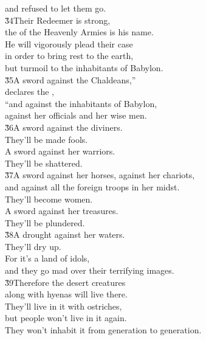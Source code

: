 \begin{poetry}
\poemll    and refused to let them go. \\
\poeml \v{34}Their Redeemer is strong, \\
\poemll    the  of the Heavenly Armies is his name. \\
\poeml He will vigorously plead their case \\
\poemll    in order to bring rest to the earth, \\
\poemlll       but turmoil to the inhabitants of Babylon. \\
\poeml \v{35}A sword against the Chaldeans,'' \\
\poemll    declares the , \\
\poeml ``and against the inhabitants of Babylon, \\
\poemll    against her officials and her wise men. \\
\poeml \v{36}A sword against the diviners. \\
\poemll    They'll be made fools. \\
\poeml A sword against her warriors. \\
\poemll    They'll be shattered. \\
\poeml \v{37}A sword against her horses, against her chariots, \\
\poemll    and against all the foreign troops in her midst. \\
\poeml They'll become women. \\
\poemll    A sword against her treasures. \\
\poemll    They'll be plundered. \\
\poeml \v{38}A drought against her waters. \\
\poemll    They'll dry up. \\
\poeml For it's a land of idols, \\
\poemll    and they go mad over their terrifying images. \\
\poeml \v{39}Therefore the desert creatures \\
\poemll    along with hyenas will live there. \\
\poeml They'll live in it with ostriches, \\
\poemll    but people won't live in it again. \\
\poemlll       They won't inhabit it from generation to generation. \\

\end{poetry}
